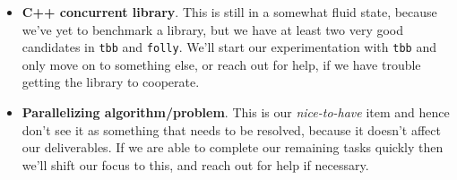 \documentclass[11pt]{article}
\begin{document}
\begin{itemize}
\item
{\bf C++ concurrent library}. This is still in a somewhat fluid state, because
we've yet to benchmark a library, but we have at least two very good candidates
in {\tt tbb} and {\tt folly}. We'll start our experimentation with {\tt tbb} and
only move on to something else, or reach out for help, if we have trouble
getting the library to cooperate.
\item
{\bf Parallelizing algorithm/problem}. This is our {\it nice-to-have} item and
hence don't see it as something that needs to be resolved, because it doesn't
affect our deliverables. If we are able to complete our remaining tasks quickly
then we'll shift our focus to this, and reach out for help if necessary.
\end{itemize}

\printbibliography
\end{document}
